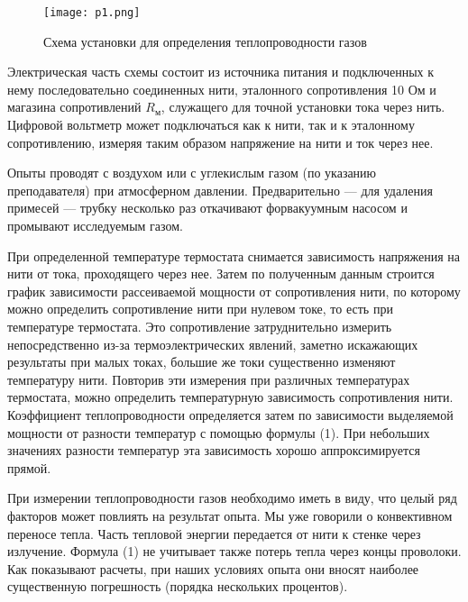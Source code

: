 \begin{figure}[h]
    \centering
    \texttt{[image: p1.png]}
    \caption{Схема установки для определения теплопроводности газов}
\end{figure}

Электрическая часть схемы состоит из источника питания и подключенных к нему последовательно соединенных нити, эталонного сопротивления 10 Ом и магазина сопротивлений $R_\text{м}$, служащего для точной установки тока через нить. Цифровой вольтметр может подключаться как к нити, так и к эталонному сопротивлению, измеряя таким образом напряжение на нити и ток через нее.

Опыты проводят с воздухом или с углекислым газом (по указанию преподавателя) при атмосферном давлении. Предварительно — для удаления примесей — трубку несколько раз откачивают форвакуумным насосом и промывают исследуемым газом.

При определенной температуре термостата снимается зависимость напряжения на нити от тока, проходящего через нее. Затем по полученным данным строится график зависимости рассеиваемой мощности от сопротивления нити, по которому можно определить сопротивление нити при нулевом токе, то есть при температуре термостата. Это сопротивление затруднительно измерить непосредственно из-за термоэлектрических явлений, заметно искажающих результаты при малых токах, большие же токи существенно изменяют температуру нити. Повторив эти измерения при различных температурах термостата, можно определить температурную зависимость сопротивления нити. Коэффициент теплопроводности определяется затем по
зависимости выделяемой мощности от разности температур с помощью формулы (1). При небольших значениях разности температур эта зависимость хорошо аппроксимируется прямой.

При измерении теплопроводности газов необходимо иметь в виду, что целый ряд факторов может повлиять на результат опыта. Мы уже говорили о конвективном переносе тепла. Часть тепловой энергии передается от нити к стенке через излучение. Формула (1) не учитывает также потерь тепла через концы проволоки. Как показывают расчеты, при наших условиях опыта они вносят наиболее существенную погрешность (порядка нескольких процентов).
